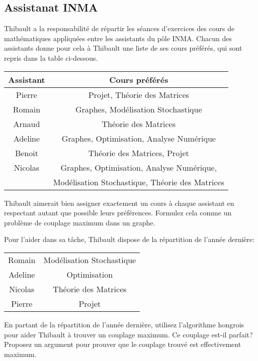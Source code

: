 \subsection{Assistanat INMA}
Thibault a la responsabilité de répartir les séances d'exercices des cours de mathématiques appliquées entre les assistants du pôle INMA. Chacun des assistants donne pour cela à Thibault une liste de ses cours préférés, qui sont repris dans la table ci-dessous.

\begin{center}
  \begin{tabular}{|c|c|}
    \hline
    Assistant & Cours préférés \\
    \hline
    Pierre & Projet, Théorie des Matrices \\
    Romain & Graphes, Modélisation Stochastique \\
    Arnaud & Théorie des Matrices \\
    Adeline & Graphes, Optimisation, Analyse Numérique \\
    Benoit & Théorie des Matrices, Projet \\
    Nicolas & Graphes, Optimisation, Analyse Numérique, \\
            & Modélisation Stochastique, Théorie des Matrices  \\
    \hline
  \end{tabular}
\end{center}

Thibault aimerait bien assigner exactement un cours à chaque assistant en respectant autant que possible leurs préférences. Formulez cela comme un problème de couplage maximum dans un graphe.

Pour l'aider dans sa tâche, Thibault dispose de la répartition de l'année dernière:

\begin{center}
  \begin{tabular}{|c|c|}
    \hline
    Romain & Modélisation Stochastique \\
    Adeline & Optimisation \\
    Nicolas & Théorie des Matrices \\
    Pierre & Projet \\
    \hline
  \end{tabular}
\end{center}

En partant de la répartition de l'année dernière, utilisez l'algorithme hongrois pour aider Thibault à trouver un couplage maximum. Ce couplage est-il parfait? Proposez un argument pour prouver que le couplage trouvé est effectivement maximum.

